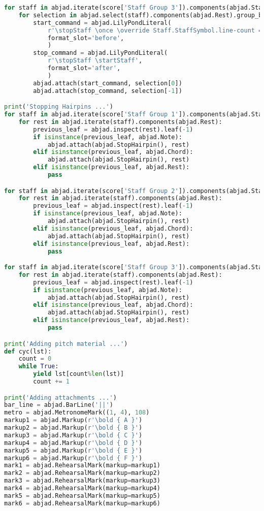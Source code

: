 \begin{lstlisting}[language=Python, caption=Tianshu Segment\_I]
for staff in abjad.iterate(score['Staff Group 3']).components(abjad.Staff):
    for selection in abjad.select(staff).components(abjad.Rest).group_by_contiguity():
        start_command = abjad.LilyPondLiteral(
            r'\stopStaff \once \override Staff.StaffSymbol.line-count = #1 \startStaff',
            format_slot='before',
            )
        stop_command = abjad.LilyPondLiteral(
            r'\stopStaff \startStaff',
            format_slot='after',
            )
        abjad.attach(start_command, selection[0])
        abjad.attach(stop_command, selection[-1])

print('Stopping Hairpins ...')
for staff in abjad.iterate(score['Staff Group 1']).components(abjad.Staff):
    for rest in abjad.iterate(staff).components(abjad.Rest):
        previous_leaf = abjad.inspect(rest).leaf(-1)
        if isinstance(previous_leaf, abjad.Note):
            abjad.attach(abjad.StopHairpin(), rest)
        elif isinstance(previous_leaf, abjad.Chord):
            abjad.attach(abjad.StopHairpin(), rest)
        elif isinstance(previous_leaf, abjad.Rest):
            pass

for staff in abjad.iterate(score['Staff Group 2']).components(abjad.Staff):
    for rest in abjad.iterate(staff).components(abjad.Rest):
        previous_leaf = abjad.inspect(rest).leaf(-1)
        if isinstance(previous_leaf, abjad.Note):
            abjad.attach(abjad.StopHairpin(), rest)
        elif isinstance(previous_leaf, abjad.Chord):
            abjad.attach(abjad.StopHairpin(), rest)
        elif isinstance(previous_leaf, abjad.Rest):
            pass

for staff in abjad.iterate(score['Staff Group 3']).components(abjad.Staff):
    for rest in abjad.iterate(staff).components(abjad.Rest):
        previous_leaf = abjad.inspect(rest).leaf(-1)
        if isinstance(previous_leaf, abjad.Note):
            abjad.attach(abjad.StopHairpin(), rest)
        elif isinstance(previous_leaf, abjad.Chord):
            abjad.attach(abjad.StopHairpin(), rest)
        elif isinstance(previous_leaf, abjad.Rest):
            pass

print('Adding pitch material ...')
def cyc(lst):
    count = 0
    while True:
        yield lst[count%len(lst)]
        count += 1

print('Adding attachments ...')
bar_line = abjad.BarLine('||')
metro = abjad.MetronomeMark((1, 4), 108)
markup1 = abjad.Markup(r'\bold { A }')
markup2 = abjad.Markup(r'\bold { B }')
markup3 = abjad.Markup(r'\bold { C }')
markup4 = abjad.Markup(r'\bold { D }')
markup5 = abjad.Markup(r'\bold { E }')
markup6 = abjad.Markup(r'\bold { F }')
mark1 = abjad.RehearsalMark(markup=markup1)
mark2 = abjad.RehearsalMark(markup=markup2)
mark3 = abjad.RehearsalMark(markup=markup3)
mark4 = abjad.RehearsalMark(markup=markup4)
mark5 = abjad.RehearsalMark(markup=markup5)
mark6 = abjad.RehearsalMark(markup=markup6)


\end{lstlisting}
